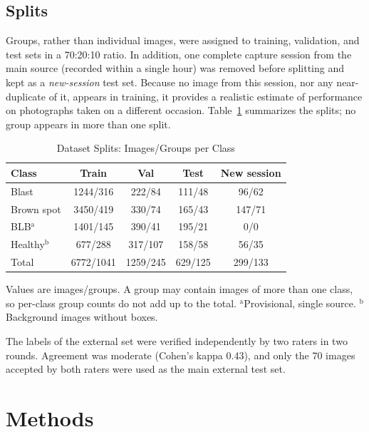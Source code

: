 \documentclass[conference,a4paper]{IEEEtran}
\begin{document}
\subsection{Splits}
Groups, rather than individual images, were assigned to training, validation, and test sets in a 70:20:10 ratio. In addition, one complete capture session from the main source (recorded within a single hour) was removed before splitting and kept as a \emph{new-session} test set. Because no image from this session, nor any near-duplicate of it, appears in training, it provides a realistic estimate of performance on photographs taken on a different occasion. Table~\ref{tab:data} summarizes the splits; no group appears in more than one split.

\begin{table}[htbp]
\caption{Dataset Splits: Images/Groups per Class}
\begin{center}
\setlength{\tabcolsep}{3pt}
\begin{tabular}{|l|c|c|c|c|}
\hline
\textbf{Class} & \textbf{Train} & \textbf{Val} & \textbf{Test} & \textbf{New session} \\
\hline
Blast & 1244/316 & 222/84 & 111/48 & 96/62 \\
Brown spot & 3450/419 & 330/74 & 165/43 & 147/71 \\
BLB$^{\mathrm{a}}$ & 1401/145 & 390/41 & 195/21 & 0/0 \\
Healthy$^{\mathrm{b}}$ & 677/288 & 317/107 & 158/58 & 56/35 \\
\hline
Total & 6772/1041 & 1259/245 & 629/125 & 299/133 \\
\hline
\end{tabular}
\par\vspace{2pt}
\parbox{\linewidth}{\scriptsize Values are images/groups. A group may contain images of more than one class, so per-class group counts do not add up to the total. $^{\mathrm{a}}$Provisional, single source. $^{\mathrm{b}}$Background images without boxes.}
\label{tab:data}
\end{center}
\end{table}

The labels of the external set were verified independently by two raters in two rounds. Agreement was moderate (Cohen's kappa 0.43), and only the 70 images accepted by both raters were used as the main external test set.

\section{Methods}
\end{document}
